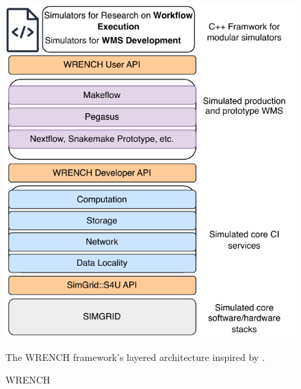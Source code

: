 \begin{figure}[H]
    \centering
    \includegraphics[scale=0.7]{fig/02/02-wrench.pdf}
    \small
    \caption{WRENCH}
    \label{fig:02-wrench}
    \tiny
    The WRENCH framework's layered architecture inspired by \cite{wrench}.
\end{figure}





